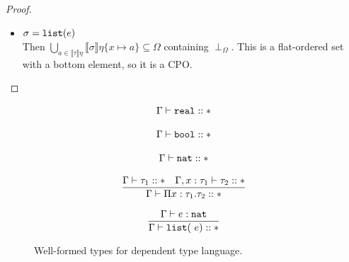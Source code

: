 \begin{proof}
\begin{itemize}
\begin{align*}
\bigcup_{b \in \llbracket \sigma_1 \rrbracket\eta\{x\mapsto a\}} \llbracket \sigma_2\rrbracket\eta
\{x\mapsto a\}\{y\mapsto b\}
\end{align*} 
is a CPO --- call this $Q_a$.  Also,  $\llbracket\sigma_1\rrbracket\eta\{x\mapsto a\} $ is a CPO --- call this $P_a$.
\begin{align*}
&= \{ f : \bigcup_{a \in \llbracket\tau\rrbracket\eta} P_a \rightarrow 
\bigcup_{a \in \llbracket \tau \rrbracket\eta} Q_a \mid
d \in P_a \implies f(d) \in Q_a\}
\end{align*}
We can show that this set is a CPO by constructing a bottom element $\perp$ such that for 
$\forall a \in \llbracket\tau\rrbracket\eta, \ \forall d \in P_a, \
\perp(d) = \perp_{Q_a}$, the bottom element of $Q_a$. Also, for any chain $C$ in this set, we can construct
a least upper bound $\bigvee C$ in a similar pointwise fashion. This proof is analogous to the proof that
$\llbracket \Pi(x: \tau).\sigma\rrbracket\eta$ is a CPO.
\item $\sigma = \texttt{list}(e)$ \\
Then $\bigcup_{a \in \llbracket \tau \rrbracket\eta}
\llbracket \sigma \rrbracket\eta\{x\mapsto a\} \subseteq \Omega$ containing $\perp_{\Omega}$. This is a flat-ordered
set with a bottom element, so it is a CPO.

\end{itemize}
\end{proof}


\begin{figure}
\[
\begin{array}{c}
\Gamma \vdash \texttt{real} :: * \\ \\
\Gamma \vdash \texttt{bool} :: *\\ \\
\Gamma \vdash \texttt{nat} :: * \\ \\ 
\dfrac{\Gamma \vdash \tau_1 :: * \ \ \ \Gamma, x:\tau_1 \vdash \tau_2 :: *}{\Gamma \vdash \Pi x:\tau_1.\tau_2 :: *} \\ \\
\dfrac{\Gamma \vdash e : \texttt{nat}}{\Gamma \vdash \texttt{list}(\ e) :: *} 
\end{array}
\]
\caption{Well-formed types for dependent type language.}
\end{figure}

